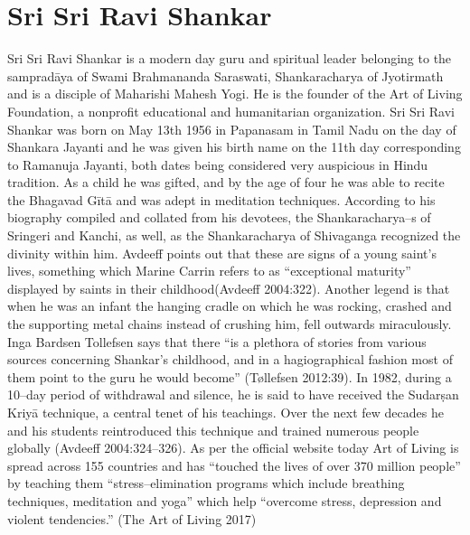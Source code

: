\section*{Sri Sri Ravi Shankar}

Sri Sri Ravi Shankar is a modern day guru and spiritual leader belonging to the sampradāya of Swami Brahmananda Saraswati, Shankaracharya of Jyotirmath and is a disciple of Maharishi Mahesh Yogi. He is the founder of the Art of Living Foundation, a nonprofit educational and humanitarian organization. Sri Sri Ravi Shankar was born on May 13th 1956 in Papanasam in Tamil Nadu on the day of Shankara Jayanti and he was given his birth name on the 11th day corresponding to Ramanuja Jayanti, both dates being considered very auspicious in Hindu tradition. As a child he was gifted, and by the age of four he was able to recite the Bhagavad Gītā and was adept in meditation techniques. According to his biography compiled and collated from his devotees, the Shankaracharya–s of Sringeri and Kanchi, as well, as the Shankaracharya of Shivaganga recognized the divinity within him. Avdeeff points out that these are signs of a young saint’s lives, something which Marine Carrin refers to as “exceptional maturity” displayed by saints in their childhood(Avdeeff 2004:322). Another legend is that when he was an infant the hanging cradle on which he was rocking, crashed and the supporting metal chains instead of crushing him, fell outwards miraculously. Inga Bardsen Tollefsen says that there “is a plethora of stories from various sources concerning Shankar’s childhood, and in a hagiographical fashion most of them point to the guru he would become” (Tøllefsen 2012:39). In 1982, during a 10–day period of withdrawal and silence, he is said to have received the Sudarṣan Kriyā technique, a central tenet of his teachings. Over the next few decades he and his students reintroduced this technique and trained numerous people globally (Avdeeff 2004:324–326). As per the official website today Art of Living is spread across 155 countries and has “touched the lives of over 370 million people” by teaching them “stress–elimination programs which include breathing techniques, meditation and yoga” which help “overcome stress, depression and violent tendencies.” (The Art of Living 2017)

